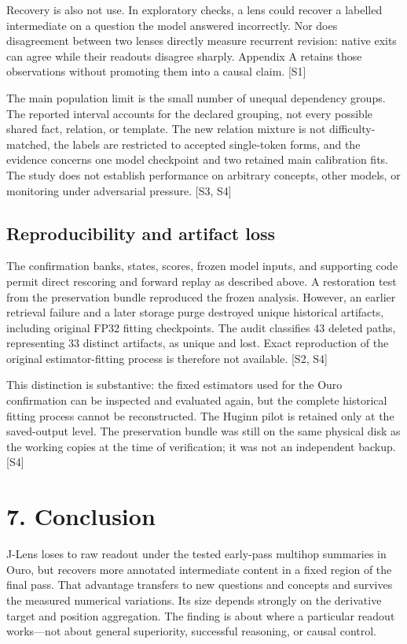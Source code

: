 \documentclass[
  11pt,
  a4paper,
]{article}
\begin{document}
Recovery is also not use. In exploratory checks, a lens could recover a
labelled intermediate on a question the model answered incorrectly. Nor
does disagreement between two lenses directly measure recurrent
revision: native exits can agree while their readouts disagree sharply.
Appendix A retains those observations without promoting them into a
causal claim. {[}S1{]}

The main population limit is the small number of unequal dependency
groups. The reported interval accounts for the declared grouping, not
every possible shared fact, relation, or template. The new relation
mixture is not difficulty-matched, the labels are restricted to accepted
single-token forms, and the evidence concerns one model checkpoint and
two retained main calibration fits. The study does not establish
performance on arbitrary concepts, other models, or monitoring under
adversarial pressure. {[}S3, S4{]}

\subsection{Reproducibility and artifact
loss}\label{reproducibility-and-artifact-loss}

The confirmation banks, states, scores, frozen model inputs, and
supporting code permit direct rescoring and forward replay as described
above. A restoration test from the preservation bundle reproduced the
frozen analysis. However, an earlier retrieval failure and a later
storage purge destroyed unique historical artifacts, including original
FP32 fitting checkpoints. The audit classifies 43 deleted paths,
representing 33 distinct artifacts, as unique and lost. Exact
reproduction of the original estimator-fitting process is therefore not
available. {[}S2, S4{]}

This distinction is substantive: the fixed estimators used for the Ouro
confirmation can be inspected and evaluated again, but the complete
historical fitting process cannot be reconstructed. The Huginn pilot is
retained only at the saved-output level. The preservation bundle was
still on the same physical disk as the working copies at the time of
verification; it was not an independent backup. {[}S4{]}

\section{7. Conclusion}\label{conclusion}

J-Lens loses to raw readout under the tested early-pass multihop
summaries in Ouro, but recovers more annotated intermediate content in a
fixed region of the final pass. That advantage transfers to new
questions and concepts and survives the measured numerical variations.
Its size depends strongly on the derivative target and position
aggregation. The finding is about where a particular readout works---not
about general superiority, successful reasoning, or causal control.
\end{document}
